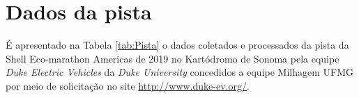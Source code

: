 \chapter{Dados da pista}

É apresentado na Tabela \ref{tab:Pista} o dados coletados e processados da pista da Shell Eco-marathon Americas de 2019
 no Kartódromo de Sonoma pela equipe \textit{Duke Electric Vehicles} da 
\textit{Duke University} concedidos a equipe Milhagem UFMG por meio de solicitação no site \url{http://www.duke-ev.org/}.

